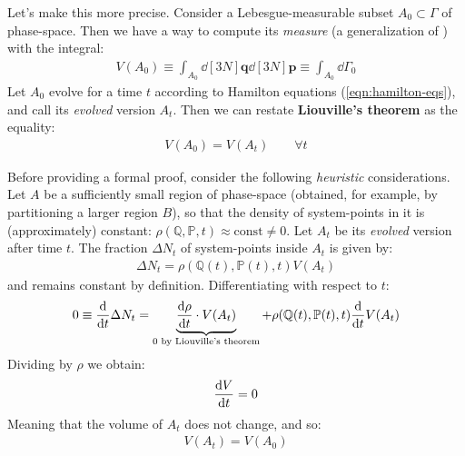 \documentclass[../../main.tex]{subfiles}
\begin{document}
\medskip

Let's make this more precise. Consider a Lebesgue-measurable subset $A_0 \subset \Gamma$ of phase-space. Then we have a way to compute its \textit{measure} (a generalization of ) with the integral:
\begin{align*}
    V(A_0) \equiv \int_{A_0} \dd[3N]{\bm{q}} \dd[3N]{\bm{p}} \equiv \int_{A_0} \dd{\Gamma_0}
\end{align*} 
Let $A_0$ evolve for a time $t$ according to Hamilton equations (\ref{eqn:hamilton-eqs}), and call its \textit{evolved} version $A_t$. Then we can restate \textbf{Liouville's theorem} as the equality:
\begin{align*}
    V(A_0) = V(A_t) \qquad \forall t
\end{align*} 

Before providing a formal proof, consider the following \textit{heuristic} considerations. Let $A$ be a sufficiently small region of phase-space (obtained, for example, by partitioning a larger region $B$), so that the density of system-points in it is (approximately) constant: $\rho(\mathbb{Q},\mathbb{P},t) \approx \mathrm{const} \neq 0$. Let $A_t$ be its \textit{evolved} version after time $t$. The fraction $\Delta N_t$ of system-points inside $A_t$ is given by:
\begin{align*}
    \Delta N_t = \rho(\mathbb{Q}(t), \mathbb{P}(t), t) V(A_t)
\end{align*}
and remains constant by definition. Differentiating with respect to $t$:
\begin{align*}
    0 \equiv \dv{t} \Delta N_t = \underbrace{\dv{\rho}{t} (\mathbb{Q}(t), \mathbb{P}(t), t) \cdot V(A_t)}_{0 \text{ by Liouville's theorem}} + \rho(\mathbb{Q}(t), \mathbb{P}(t), t) \dv{t} V(A_t)
\end{align*}
Dividing by $\rho$ we obtain:
\begin{align*}
    \dv{V}{t} (A_t) = 0
\end{align*}
Meaning that the volume of $A_t$ does not change, and so:
\begin{align*}
    V(A_t) = V(A_0)
\end{align*}

\medskip
\end{document}
